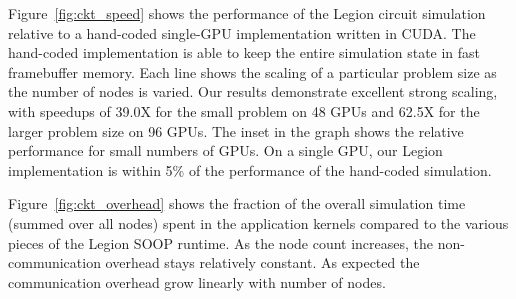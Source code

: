 Figure~\ref{fig:ckt_speed} shows the performance of the Legion circuit simulation relative
to a hand-coded single-GPU implementation written in CUDA.  The hand-coded implementation is
able to keep the entire simulation state in fast framebuffer memory.  Each line shows the scaling of
a particular problem size as the number of nodes is varied.  Our results demonstrate
excellent strong scaling, with speedups of 39.0X for the small problem on 48 GPUs and 
62.5X for the larger problem size on 96 GPUs.  The inset in the graph shows the relative
performance for small numbers of GPUs.  On a single GPU, our Legion implementation
is within 5\% of the performance of the hand-coded simulation.

Figure~\ref{fig:ckt_overhead} shows the fraction of the overall simulation time (summed over
all nodes) spent in the application kernels compared to the various pieces of the Legion
SOOP runtime.  As the node count increases, the non-communication overhead stays relatively constant.
As expected the communication overhead grow linearly with number of nodes.

